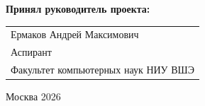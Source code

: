 \begin{titlepage}
\vspace{1em}
{\bf Принял руководитель проекта: \vspace{2mm}}

{
\begin{tabular}{l}
Ермаков Андрей Максимович\\
Аспирант\\
Факультет компьютерных наук НИУ ВШЭ 
\end{tabular}}





\vspace{\fill}

\begin{center}
Москва 2026
\end{center}

\end{titlepage}